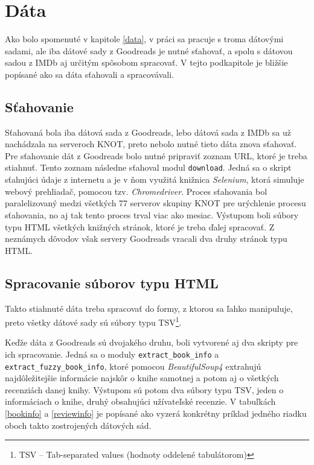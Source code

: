 \section{Dáta}

Ako bolo spomenuté v kapitole \ref{data}, v práci sa pracuje s troma dátovými sadami, ale iba dátové sady z Goodreads je nutné sťahovať, a spolu s dátovou sadou z IMDb aj určitým spôsobom spracovať. V tejto podkapitole je bližšie popísané ako sa dáta sťahovali a spracovávali.

\subsection*{Sťahovanie}

Sťahovaná bola iba dátová sada z Goodreads, lebo dátová sada z IMDb sa už nachádzala na serveroch KNOT, preto nebolo nutné tieto dáta znova sťahovať. Pre sťahovanie dát z Goodreads bolo nutné pripraviť zoznam URL, ktoré je treba stiahnuť. Tento zoznam následne sťahoval modul {\tt download}. Jedná sa o skript sťahujúci údaje z internetu a je v ňom využitá knižnica \textit{Selenium}, ktorá simuluje webový prehliadač, pomocou tzv. \textit{Chromedriver}. Proces sťahovania bol paralelizovaný medzi všetkých 77 serverov skupiny KNOT pre urýchlenie procesu sťahovania, no aj tak tento proces trval viac ako mesiac. Výstupom boli súbory typu HTML všetkých knižných stránok, ktoré je treba ďalej spracovať. Z neznámych dôvodov však servery Goodreads vracali dva druhy stránok typu HTML.

\subsection*{Spracovanie súborov typu HTML}

Takto stiahnuté dáta treba spracovať do formy, z ktorou sa ľahko manipuluje, preto všetky dátové sady sú súbory typu TSV\footnote{TSV -- Tab-separated values (hodnoty oddelené tabulátorom)}.

Keďže dáta z Goodreads sú dvojakého druhu, boli vytvorené aj dva skripty pre ich spracovanie. Jedná sa o moduly {\tt extract\_book\_info} a {\tt extract\_fuzzy\_book\_info}, ktoré pomocou \textit{BeautifulSoup4} extrahujú najdôležitejšie informácie najskôr o knihe samotnej a potom aj o všetkých recenziách danej knihy. Výstupom sú potom dva súbory typu TSV, jeden o informáciach o knihe, druhý obsahujúci užívateľské recenzie. V tabuľkách \ref{bookinfo} a \ref{reviewinfo} je popísané ako vyzerá konkrétny príklad jedného riadku oboch takto zostrojených dátových sád. 

